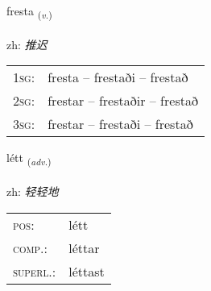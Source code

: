 \documentclass[frontgrid, backgrid]{flacards}\usepackage[]{graphicx}\usepackage[]{color}
\begin{document}
\renewcommand{\flhead}{\vskip5pt \fboxsep=0pt {\small\bfseries\footnotesize Sagnorð | 动词}}
\renewcommand{\fcfoot}{\vskip5pt \fboxsep=0pt \hspace{2pt}{\small\bfseries\footnotesize 2K}}

\renewcommand{\blhead}{\vskip5pt {\small\bfseries\footnotesize Sagnorð | 动词 }}
\renewcommand{\bcfoot}{\vskip5pt \hspace{2pt}{\small\bfseries\footnotesize 2K}}


{fresta \small{\textsubscript{(\textit{v.})}} \\[1ex] %
\textphonetic{[frɛsta]} \\
zh: \emph{推迟} \\  [2ex]
\renewcommand*{\arraystretch}{0.8}
\begin{tabular}{p{1cm}l}
\textsc{1sg}: & fresta -- frestaði -- frestað \\ 
\textsc{2sg}: & frestar -- frestaðir -- frestað \\ 
\textsc{3sg}: & frestar -- frestaði -- frestað \\ 
\end{tabular}
}

\renewcommand{\flhead}{\vskip5pt \fboxsep=0pt {\small\bfseries\footnotesize Atviksorð | 副词}}
\renewcommand{\fcfoot}{\vskip5pt \fboxsep=0pt \hspace{2pt}{\small\bfseries\footnotesize 2K}}

\renewcommand{\blhead}{\vskip5pt {\small\bfseries\footnotesize Atviksorð | 副词 }}
\renewcommand{\bcfoot}{\vskip5pt \hspace{2pt}{\small\bfseries\footnotesize 2K}}


{létt \small{\textsubscript{(\textit{adv.})}} \\[1ex] %
\textphonetic{[ljɛht]} \\
zh: \emph{轻轻地} \\  [2ex]
\renewcommand*{\arraystretch}{0.8}
\begin{tabular}{ll}
\textsc{pos}: & létt \\ 
\textsc{comp.}: & léttar \\ 
\textsc{superl.}: & léttast \\
\end{tabular}
}
\end{document}
